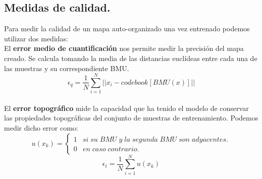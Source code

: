 \subsection{Medidas de calidad.}
Para medir la calidad de un mapa auto-organizado una vez entrenado podemos utilizar dos medidas:\\

El \textbf{error medio de cuantificación} nos permite medir la precisión del mapa creado. Se calcula tomando la media de las distancias euclídeas entre cada una de las muestras y su correspondiente BMU.\\

$$
\epsilon_q = \frac{1}{N}\sum_{i=1}^{N}  || x_i - codebook[BMU(x)] ||
$$\\

El \textbf{error topográfico} mide la capacidad que ha tenido el modelo de conservar las propiedades topográficas del conjunto de muestras de entrenamiento. Podemos medir dicho error como:\\
$$
u(x_k) = \left\{
\begin{array}{ll}
1 & si \; su \; BMU \; y \; la \; segunda \; BMU \; son \; adyacentes.\\
0 & en \; caso \; contrario.
\end{array}
\right.
$$
$$
\epsilon_t =  \frac{1}{N}\sum_{i=1}^{N} u(x_k)
$$\\

\newpage